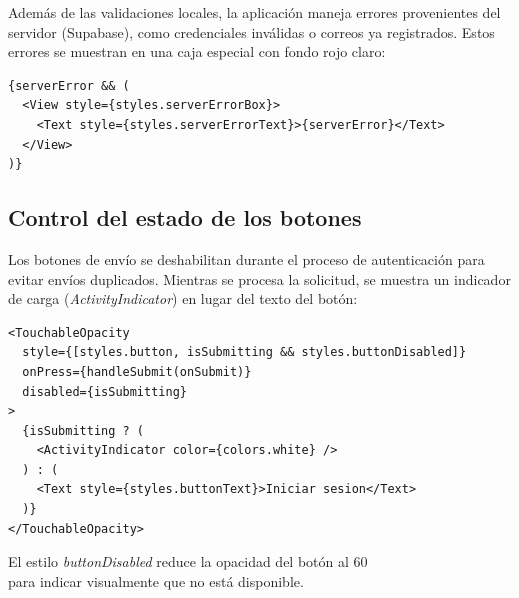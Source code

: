 Adem\'as de las validaciones locales, la aplicaci\'on maneja errores
provenientes del servidor (Supabase), como credenciales inv\'alidas o
correos ya registrados. Estos errores se muestran en una caja especial
con fondo rojo claro:

\begin{lstlisting}
{serverError && (
  <View style={styles.serverErrorBox}>
    <Text style={styles.serverErrorText}>{serverError}</Text>
  </View>
)}
\end{lstlisting}

\subsection{Control del estado de los botones}

Los botones de env\'io se deshabilitan durante el proceso de
autenticaci\'on para evitar env\'ios duplicados. Mientras se procesa la
solicitud, se muestra un indicador de carga (\textit{ActivityIndicator})
en lugar del texto del bot\'on:

\begin{lstlisting}
<TouchableOpacity
  style={[styles.button, isSubmitting && styles.buttonDisabled]}
  onPress={handleSubmit(onSubmit)}
  disabled={isSubmitting}
>
  {isSubmitting ? (
    <ActivityIndicator color={colors.white} />
  ) : (
    <Text style={styles.buttonText}>Iniciar sesion</Text>
  )}
</TouchableOpacity>
\end{lstlisting}

El estilo \textit{buttonDisabled} reduce la opacidad del bot\'on al 60\\%
para indicar visualmente que no est\'a disponible.
